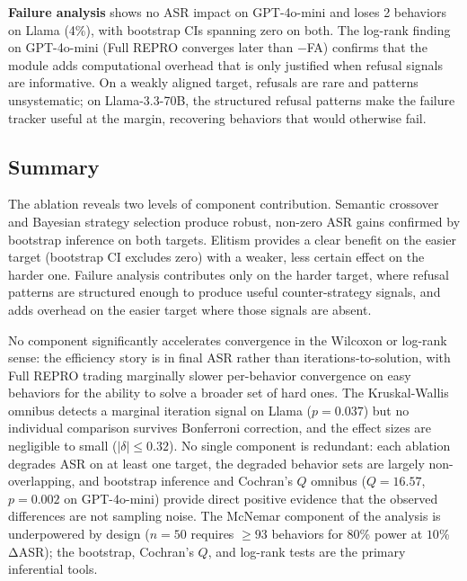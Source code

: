 \textbf{Failure analysis} shows no ASR impact on GPT-4o-mini and loses
2 behaviors on Llama (4\%), with bootstrap CIs spanning zero on both.
The log-rank finding on GPT-4o-mini (Full REPRO converges later than
$-$FA) confirms that the module adds computational overhead that is only
justified when refusal signals are informative.
On a weakly aligned target, refusals are rare and patterns unsystematic;
on Llama-3.3-70B, the structured refusal patterns make the failure tracker
useful at the margin, recovering behaviors that would otherwise fail.

\subsection{Summary}

The ablation reveals two levels of component contribution.
Semantic crossover and Bayesian strategy selection produce robust,
non-zero ASR gains confirmed by bootstrap inference on both targets.
Elitism provides a clear benefit on the easier target (bootstrap CI
excludes zero) with a weaker, less certain effect on the harder one.
Failure analysis contributes only on the harder target, where refusal
patterns are structured enough to produce useful counter-strategy signals,
and adds overhead on the easier target where those signals are absent.

No component significantly accelerates convergence in the Wilcoxon or
log-rank sense: the efficiency story is in final ASR rather than
iterations-to-solution, with Full REPRO trading marginally slower
per-behavior convergence on easy behaviors for the ability to solve a
broader set of hard ones.
The Kruskal-Wallis omnibus detects a marginal iteration signal on Llama
($p{=}0.037$) but no individual comparison survives Bonferroni correction,
and the effect sizes are negligible to small ($|\delta|{\leq}0.32$).
No single component is redundant: each ablation degrades ASR on at least
one target, the degraded behavior sets are largely non-overlapping, and
bootstrap inference and Cochran's $Q$ omnibus ($Q{=}16.57$,
$p{=}0.002$ on GPT-4o-mini) provide direct positive evidence that the
observed differences are not sampling noise.
The McNemar component of the analysis is underpowered by design ($n{=}50$
requires $\geq 93$ behaviors for $80$\% power at $10$\% ΔASR); the
bootstrap, Cochran's $Q$, and log-rank tests are the primary inferential
tools.


